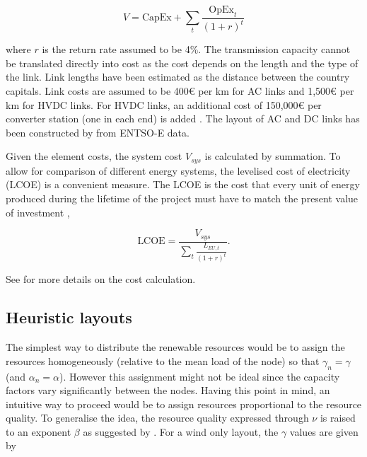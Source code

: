 \documentclass[a4paper, 5p, sort&compress]{elsarticle}%
\newcommand{\paren}[1]{\left(#1\right)}
\begin{document}
\begin{equation}
  \label{eq:6}
  V = \text{CapEx} + \sum_{t} \frac{\text{OpEx}_{t}}{\paren{1 + r}^{t}}
\end{equation}

where $r$ is the return rate assumed to be 4\%. The transmission
capacity cannot be translated directly into cost as the cost depends
on the length and the type of the link. Link lengths have been
estimated as the distance between the country capitals. Link costs are
assumed to be 400\euro{}
per km for AC links and 1,500\euro{}
per km for HVDC links. For HVDC links, an additional cost of
150,000\euro{}
per converter station (one in each end) is
added \cite{McKinsey, Schaber, Schaber2}. The layout of AC and
DC links has been constructed by \cite{rolando2014} from ENTSO-E data.


Given the element costs, the system cost $V_{sys}$ is calculated by
summation. To allow for comparison of different energy systems, the
levelised cost of electricity (LCOE) is a convenient measure. The LCOE
is the cost that every unit of energy produced during the lifetime of
the project must have to match the present value of
investment \cite{Short1995},

\begin{equation}
  \label{eq:7}
  \text{LCOE} = \frac{V_{sys}}{\sum_{t} \frac{L_{EU,
        t}}{\paren{1+r}^{t}}} .
\end{equation}

See \cite{Sensitivity} for more details on the cost calculation.

\subsection{Heuristic layouts}
\label{sec:heuristic-layouts}

The simplest way to distribute the renewable resources would be to
assign the resources homogeneously (relative to the mean load of the
node) so that $\gamma_{n} = \gamma$ (and $\alpha_{n} = \alpha$). However this assignment
might not be ideal since the capacity factors vary significantly
between the nodes. Having this point in mind, an intuitive way to
proceed would be to assign resources proportional to the resource
quality. To generalise the idea, the resource quality expressed
through $\nu$ is raised to an exponent $\beta$ as suggested by
\cite{Rolando}. For a wind only layout, the $\gamma$ values are given by
\end{document}

